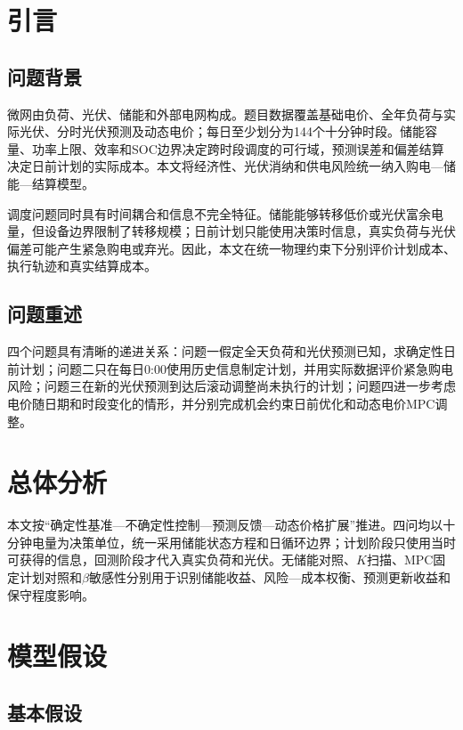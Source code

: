 \documentclass{cumcmthesis}
\begin{document}
\section{引言}

\subsection{问题背景}

微网由负荷、光伏、储能和外部电网构成。题目数据覆盖基础电价、全年负荷与实际光伏、分时光伏预测及动态电价；每日至少划分为144个十分钟时段。储能容量、功率上限、效率和SOC边界决定跨时段调度的可行域，预测误差和偏差结算决定日前计划的实际成本。本文将经济性、光伏消纳和供电风险统一纳入购电—储能—结算模型\cite{olivares2014}。

调度问题同时具有时间耦合和信息不完全特征。储能能够转移低价或光伏富余电量，但设备边界限制了转移规模；日前计划只能使用决策时信息，真实负荷与光伏偏差可能产生紧急购电或弃光。因此，本文在统一物理约束下分别评价计划成本、执行轨迹和真实结算成本。

\subsection{问题重述}

四个问题具有清晰的递进关系：问题一假定全天负荷和光伏预测已知，求确定性日前计划；问题二只在每日0:00使用历史信息制定计划，并用实际数据评价紧急购电风险；问题三在新的光伏预测到达后滚动调整尚未执行的计划；问题四进一步考虑电价随日期和时段变化的情形，并分别完成机会约束日前优化和动态电价MPC调整。

\section{总体分析}

本文按“确定性基准—不确定性控制—预测反馈—动态价格扩展”推进。四问均以十分钟电量为决策单位，统一采用储能状态方程和日循环边界；计划阶段只使用当时可获得的信息，回测阶段才代入真实负荷和光伏。无储能对照、$K$扫描、MPC固定计划对照和$\beta$敏感性分别用于识别储能收益、风险—成本权衡、预测更新收益和保守程度影响\cite{boyd2004}。

\section{模型假设}

\subsection{基本假设}
\end{document}
